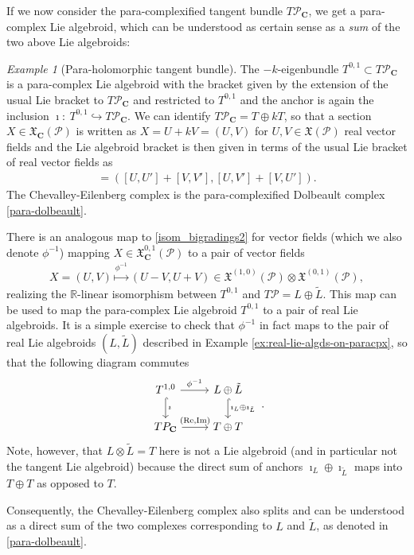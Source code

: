 \documentclass[letterpaper,12pt]{article}
\newcommand{\Cc}{\mathbf{C}}
\newcommand{\XX}{\mathfrak{X}}
\newcommand{\PS}{\mathcal{P}}
\newcommand{\Lt}{{\tl{L}}}
\def\tl{\tilde}
\theoremstyle{definition}
\theoremstyle{remark}
\theoremstyle{examples}
\newtheorem{Ex}[theorem]{Example}
\begin{document}
If we now consider the para-complexified tangent bundle $T\PS_\Cc$, we get a para-complex Lie algebroid, which can be understood as certain sense as a {\it sum} of the two above Lie algebroids:
\begin{Ex}[Para-holomorphic tangent bundle]\label{ex:para-hol-tangent}
The $-k$-eigenbundle $T^{0,1}\subset T\PS_\Cc$ is a para-complex Lie algebroid with the bracket given by the extension of the usual Lie bracket to $T\PS_\Cc$ and restricted to $T^{0,1}$ and the anchor is again the inclusion $\imath:\  T^{0,1}\hookrightarrow T\PS_\Cc$. We can identify $T\PS_\Cc=T\oplus k T$, so that a section $X\in \XX_\Cc(\PS)$ is written as $X=U+kV=(U,V)$ for $U,V \in \XX(\PS)$ real vector fields and the Lie algebroid bracket is then given in terms of the usual Lie bracket of real vector fields as
\begin{align*}
[(U,V),(U',V')]=([U,U']+[V,V'],[U,V']+[V,U']).
\end{align*}
The Chevalley-Eilenberg complex is the para-complexified Dolbeault complex \eqref{para-dolbeault}.


There is an analogous map to \eqref{isom_bigradings2} for vector fields (which we also denote $\phi^{-1}$) mapping $X \in \XX^{0,1}_\Cc(\PS)$ to a pair of vector fields
\begin{align*}
X=(U,V) \overset{\phi^{-1}}{\mapsto} (U-V,U+V) \in \XX^{(1,0)}(\PS)\otimes \XX^{(0,1)}(\PS),
\end{align*}
realizing the $\mathbb{R}$-linear isomorphism between $T^{0,1}$ and $T\PS=L\oplus \Lt$. This map can be used to map the para-complex Lie algebroid $T^{0,1}$ to a pair of real Lie algebroids. It is a simple exercise to check that $\phi^{-1}$ in fact maps to the pair of real Lie algebroids $(L,\Lt)$ described in Example \ref{ex:real-lie-algds-on-paracpx}, so that the following diagram commutes
\begin{equation*}
\begin{tikzcd}
T^{1,0} \arrow[hookrightarrow]{d}{\imath}\arrow{r}{\phi^{-1}} & L\oplus \Lt\arrow[hookrightarrow]{d}{\imath_L\oplus\imath_\Lt}\\
TP_\Cc \arrow{r}{(\text{Re},\text{Im})} & T\oplus T
\end{tikzcd}\ .
\end{equation*}
Note, however, that $L\otimes \Lt=T$ here is not a Lie algebroid (and in particular not the tangent Lie algebroid) because the direct sum of anchors $\imath_L\oplus \imath_\Lt$ maps into $T\oplus T$ as opposed to $T$.

Consequently, the Chevalley-Eilenberg complex also splits and can be understood as a direct sum of the two complexes corresponding to $L$ and $\Lt$, as denoted in \eqref{para-dolbeault}.
\end{Ex}
\end{document}

